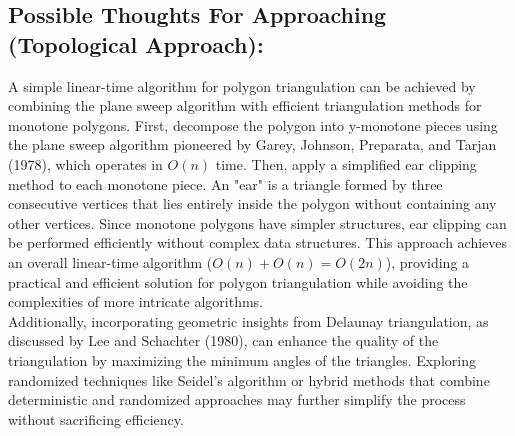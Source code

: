 \documentclass{article}
\begin{document}
\subsection*{Possible Thoughts For Approaching (Topological Approach):}
A simple linear-time algorithm for polygon triangulation can be achieved by combining the plane sweep algorithm with efficient triangulation methods for monotone polygons. First, decompose the polygon into y-monotone pieces using the plane sweep algorithm pioneered by Garey, Johnson, Preparata, and Tarjan (1978), which operates in \( O(n) \) time. Then, apply a simplified ear clipping method to each monotone piece. An "ear" is a triangle formed by three consecutive vertices that lies entirely inside the polygon without containing any other vertices. Since monotone polygons have simpler structures, ear clipping can be performed efficiently without complex data structures. This approach achieves an overall linear-time algorithm (\( O(n) + O(n) = O(2n) \)), providing a practical and efficient solution for polygon triangulation while avoiding the complexities of more intricate algorithms.
\\
Additionally, incorporating geometric insights from Delaunay triangulation, as discussed by Lee and Schachter (1980), can enhance the quality of the triangulation by maximizing the minimum angles of the triangles. Exploring randomized techniques like Seidel's algorithm or hybrid methods that combine deterministic and randomized approaches may further simplify the process without sacrificing efficiency.

\newpage
\end{document}
